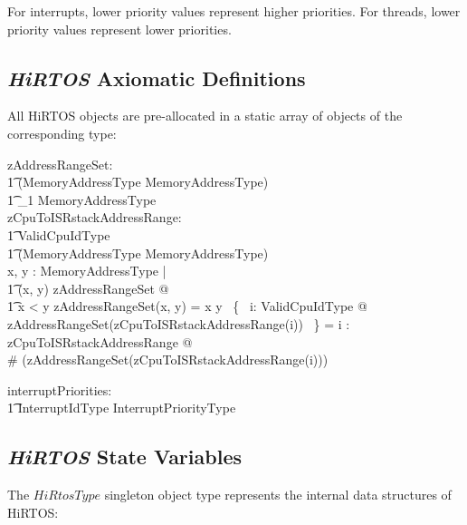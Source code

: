 \documentclass{AUJarticle}
\begin{document}
For interrupts, lower priority values represent higher priorities. For threads, lower priority
values represent lower priorities.

\subsection{\emph{HiRTOS} Axiomatic Definitions}

All HiRTOS objects are pre-allocated in a static array of objects of the corresponding type:

\begin{axdef}
    zAddressRangeSet: \\
    \t1 (MemoryAddressType \cross MemoryAddressType) \inj \\
    \t1 \finset_1 MemoryAddressType \\
    zCpuToISRstackAddressRange: \\
    \t1 ValidCpuIdType \inj \\
    \t1 (MemoryAddressType \cross MemoryAddressType) \\
\where
    \forall x, y : MemoryAddressType | \\
   \t1  (x, y) \in \dom zAddressRangeSet @ \\
   \t1 x < y \land zAddressRangeSet(x, y) = x \upto y
\also
    \bigcap~\{~ i: ValidCpuIdType @ \\
      zAddressRangeSet(zCpuToISRstackAddressRange(i)) ~\} = \emptyset
\also
    \forall i : \dom zCpuToISRstackAddressRange @ \\
       \# (zAddressRangeSet(zCpuToISRstackAddressRange(i))) 
\end{axdef}

\begin{axdef}
   interruptPriorities: \\
   \t1 InterruptIdType \fun InterruptPriorityType
\end{axdef}

\subsection{\emph{HiRTOS} State Variables}

The $HiRtosType$ singleton object type represents the internal data
structures of HiRTOS:
\end{document}

